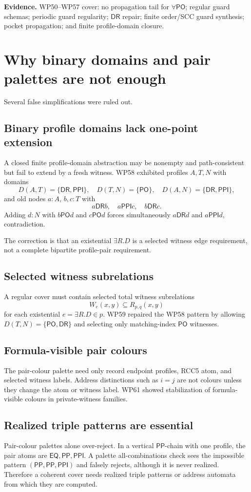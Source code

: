 \documentclass[11pt]{article}
\newcommand{\EQ}{\mathsf{EQ}}
\newcommand{\PP}{\mathsf{PP}}
\newcommand{\PPI}{\mathsf{PPI}}
\newcommand{\PO}{\mathsf{PO}}
\newcommand{\DR}{\mathsf{DR}}
\begin{document}
\noindent\textbf{Evidence.} WP50--WP57 cover: no propagation tail for $\forall\PO$; regular guard schemas; periodic guard regularity; $\DR$ repair; finite order/SCC guard synthesis; pocket propagation; and finite profile-domain closure.

\section{Why binary domains and pair palettes are not enough}

Several false simplifications were ruled out.

\subsection{Binary profile domains lack one-point extension}
A closed finite profile-domain abstraction may be nonempty and path-consistent but fail to extend by a fresh witness.  WP58 exhibited profiles $A,T,N$ with domains
\[
D(A,T)=\{\DR,\PPI\},\quad D(T,N)=\{\PO\},\quad D(A,N)=\{\DR,\PPI\},
\]
and old nodes $a:A$, $b,c:T$ with
\[
a\DR b,
\quad a\PPI c,
\quad b\DR c.
\]
Adding $d:N$ with $b\PO d$ and $c\PO d$ forces simultaneously $a\DR d$ and $a\PPI d$, contradiction.

The correction is that an existential $\exists R.D$ is a selected witness edge requirement, not a complete bipartite profile-pair requirement.

\subsection{Selected witness subrelations}
A regular cover must contain selected total witness subrelations
\[
W_e(x,y)\subseteq R_{p,q}(x,y)
\]
for each existential $e=\exists R.D\in p$.  WP59 repaired the WP58 pattern by allowing $D(T,N)=\{\PO,\DR\}$ and selecting only matching-index $\PO$ witnesses.

\subsection{Formula-visible pair colours}
The pair-colour palette need only record endpoint profiles, RCC5 atom, and selected witness labels.  Address distinctions such as $i=j$ are not colours unless they change the atom or witness label.  WP61 showed stabilization of formula-visible colours in private-witness families.

\subsection{Realized triple patterns are essential}
Pair-colour palettes alone over-reject.  In a vertical $\PP$-chain with one profile, the pair atoms are $\EQ,\PP,\PPI$.  A palette all-combinations check sees the impossible pattern $(\PP,\PP,\PPI)$ and falsely rejects, although it is never realized.  Therefore a coherent cover needs realized triple patterns or address automata from which they are computed.
\end{document}
